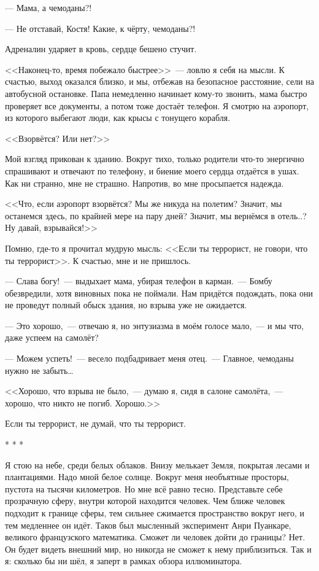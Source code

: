 \documentclass[openany, oneside]{book}
\begin{document}
--- Мама, а чемоданы?!

--- Не отставай, Костя! Какие, к чёрту, чемоданы?!

Адреналин ударяет в кровь, сердце бешено стучит.

<<Наконец-то, время побежало быстрее>>~--- ловлю я себя на мысли. К счастью, выход оказался близко, и мы, отбежав на безопасное расстояние, сели на автобусной остановке. Папа немедленно начинает кому-то звонить, мама быстро проверяет все документы, а потом тоже достаёт телефон. Я смотрю на аэропорт, из которого выбегают люди, как крысы с тонущего корабля.

<<Взорвётся? Или нет?>>

Мой взгляд прикован к зданию. Вокруг тихо, только родители что-то энергично спрашивают и отвечают по телефону, и биение моего сердца отдаётся в ушах. Как ни странно, мне не страшно. Напротив, во мне просыпается надежда.

<<Что, если аэропорт взорвётся? Мы же никуда на полетим? Значит, мы останемся здесь, по крайней мере на пару дней? Значит, мы вернёмся в отель..? Ну давай, взрывайся!>>

Помню, где-то я прочитал мудрую мысль: <<Если ты террорист, не говори, что ты террорист>>. К счастью, мне и не пришлось.

--- Слава богу!~--- выдыхает мама, убирая телефон в карман.~--- Бомбу обезвредили, хотя виновных пока не поймали. Нам придётся подождать, пока они не проведут полный обыск здания, но взрыва уже не ожидается.

--- Это хорошо,~--- отвечаю я, но энтузиазма в моём голосе мало,~--- и мы что, даже успеем на самолёт?

--- Можем успеть!~--- весело подбадривает меня отец.~--- Главное, чемоданы нужно не забыть\dots

<<Хорошо, что взрыва не было,~--- думаю я, сидя в салоне самолёта,~--- хорошо, что никто не погиб. Хорошо.>>

Если ты террорист, не думай, что ты террорист.

\begin{center}
    * * *
\end{center}

Я стою на небе, среди белых облаков. Внизу мелькает Земля, покрытая лесами и плантациями. Надо мной белое солнце. Вокруг меня необъятные просторы, пустота на тысячи километров. Но мне всё равно тесно. Представьте себе прозрачную сферу, внутри которой находится человек. Чем ближе человек подходит к границе сферы, тем сильнее сжимается пространство вокруг него, и тем медленнее он идёт. Таков был мысленный эксперимент Анри Пуанкаре, великого французского математика. Сможет ли человек дойти до границы? Нет. Он будет видеть внешний мир, но никогда не сможет к нему приблизиться. Так и я: сколько бы ни шёл, я заперт в рамках обзора иллюминатора.
\end{document}

